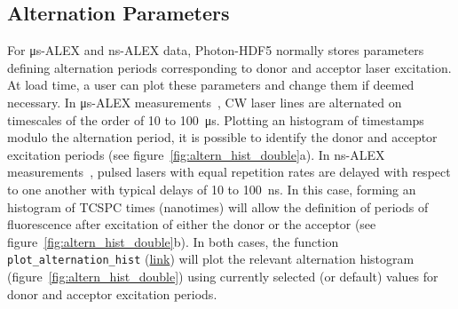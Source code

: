 \documentclass[10pt,letterpaper]{article}
\begin{document}
\subsection{Alternation Parameters}
\label{sec:alternation}

For μs-ALEX and ns-ALEX data, Photon-HDF5 normally stores parameters defining
alternation periods corresponding to donor and acceptor laser excitation.
At load time, a user can plot these parameters and change them if deemed necessary.
In μs-ALEX measurements~\cite{Kapanidis_2004},
CW laser lines are alternated on timescales of the order of 10 to 100~μs.
Plotting an histogram of timestamps modulo the alternation period, it
is possible to identify the donor and acceptor excitation periods (see figure~\ref{fig:altern_hist_double}a).
In ns-ALEX measurements~\cite{Laurence_2005},
pulsed lasers with equal repetition rates are delayed with respect
to one another with typical delays of 10 to 100~ns.
In this case, forming an histogram of TCSPC times (nanotimes) will allow
the definition of periods of fluorescence after excitation
of either the donor or the acceptor (see figure~\ref{fig:altern_hist_double}b).
In both cases, the function
\verb|plot_alternation_hist|
(\href{http://fretbursts.readthedocs.org/en/latest/plots.html#fretbursts.burst_plot.plot_alternation_hist}{link})
will plot the relevant alternation histogram (figure~\ref{fig:altern_hist_double})
using currently selected (or default) values for donor and acceptor excitation periods.
\end{document}
